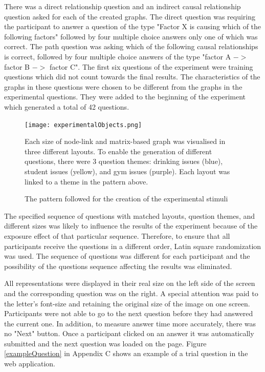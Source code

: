 \documentclass{l4proj}
\begin{document}
There was a direct relationship question and an indirect causal relationship question asked for each of the created graphs. The direct question was requiring the participant to answer a question of the type "Factor X is causing which of the following factors" followed by four multiple choice answers only one of which was correct. The path question was asking which of the following causal relationships is correct, followed by four multiple choice answers of the type "factor A $->$ factor B $->$ factor C". The first six questions of the experiment were training questions which did not count towards the final results. The characteristics of the graphs in these questions were chosen to be different from the graphs in the experimental questions. They were added to the beginning of the experiment which generated a total of 42 questions.

\begin{figure}[H]
\centering
\texttt{[image: experimentalObjects.png]}
\caption{The pattern followed for the creation of the experimental stimuli}
\label{experimentalDesign}
\medskip
\small
Each size of node-link and matrix-based graph was visualised in three different layouts. To enable the generation of different questions, there were 3 question themes: drinking issues (blue), student issues (yellow), and gym issues (purple). Each layout was linked to a theme in the pattern above.
\end{figure}

The specified sequence of questions with matched layouts, question themes, and different sizes was likely to influence the results of the experiment because of the exposure effect of that particular sequence. Therefore, to ensure that all participants receive the questions in a different order, Latin square \cite{winer1962latin} randomization was used. The sequence of questions was different for each participant and the possibility of the questions sequence affecting the results was eliminated.
  
All representations were displayed in their real size on the left side of the screen and the corresponding question was on the right. A special attention was paid to the letter's font-size and retaining the original size of the image on one screen. Participants were not able to go to the next question before they had answered the current one. In addition, to measure answer time more accurately, there was no "Next" button. Once a participant clicked on an answer it was automatically submitted and the next question was loaded on the page. Figure \ref{exampleQuestion} in Appendix C shows an example of a trial question in the web application.
\end{document}
